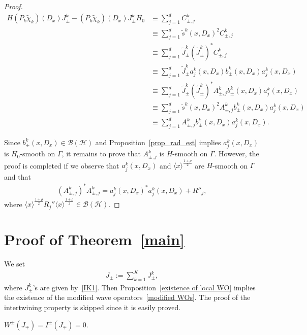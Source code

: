 \documentclass[10pt,a4paper]{amsart}
\newcommand{\HS}{\mathcal{H}}
\newcommand{\BS}{\mathcal{B}}
\newcommand{\jap}[1]{\langle #1 \rangle}
\begin{document}
\begin{proof}
\begin{align*}
H (P_k \tilde\chi_k)(D_x)J_\pm^k - (P_k \tilde\chi_k)(D_x)J_\pm^k H_0 
&\equiv \sum_{j=1}^d C_{\pm,j}^k \\
&\equiv \sum_{j=1}^d \tilde s^k(x,D_x)^2 C_{\pm,j}^k \\
&\equiv \sum_{j=1}^d \tilde J_\pm^k (\tilde J_\pm^k)^* C_{\pm,j}^k \\
&\equiv \sum_{j=1}^d \tilde J_\pm^k a_j^k(x,D_x) b_\pm^k(x,D_x) a_j^k(x,D_x) \\
&\equiv \sum_{j=1}^d \tilde J_\pm^k (\tilde J_\pm^k)^* A_{\pm,j}^k b_\pm^k(x,D_x) a_j^k(x,D_x) \\
&\equiv \sum_{j=1}^d \tilde s^k(x,D_x)^2 A_{\pm,j}^k b_\pm^k(x,D_x) a_j^k(x,D_x) \\
&\equiv \sum_{j=1}^d A_{\pm,j}^k b_\pm^k(x,D_x) a_j^k(x,D_x).
\end{align*}

Since $b_\pm^k(x,D_x) \in \BS(\HS)$ and Proposition~\ref{prop_rad_est} implies $a_j^k(x,D_x)$ is $H_0$-smooth on $\Gamma$, it remains to prove that $A_{\pm,j}^k$ is $H$-smooth on $\Gamma$. However, the proof is completed if we observe that $a_j^k(x,D_x)$ and $\jap{x}^{\frac{1+\rho}{2}}$ are $H$-smooth on $\Gamma$ and that
\begin{align*}
\left(A_{\pm,j}^k\right)^* A_{\pm,j}^k=a_j^k(x,D_x)^*a_j^k(x,D_x) + R''_j,
\end{align*}
where $\jap{x}^{\frac{1+\rho}{2}}R_j''\jap{x}^{\frac{1+\rho}{2}}\in\BS(\HS)$.
\end{proof}



\section{Proof of Theorem~\ref{main}} \label{proof section}


We set
\begin{align}\label{time-independent modifiers}
J_\pm := \sum_{k=1}^K J_\pm^k,
\end{align}
where $J_\pm^k$'s are given by~\eqref{IK1}. Then Proposition~\ref{existence of local WO} implies the existence of the modified wave operators~\eqref{modified WOs}. The proof of the intertwining property is skipped since it is easily proved.



\begin{prop}\label{nonstationary prop}
$W^\pm(J_\mp) = I^\pm(J_\mp) = 0$.
\end{prop}
\end{document}
